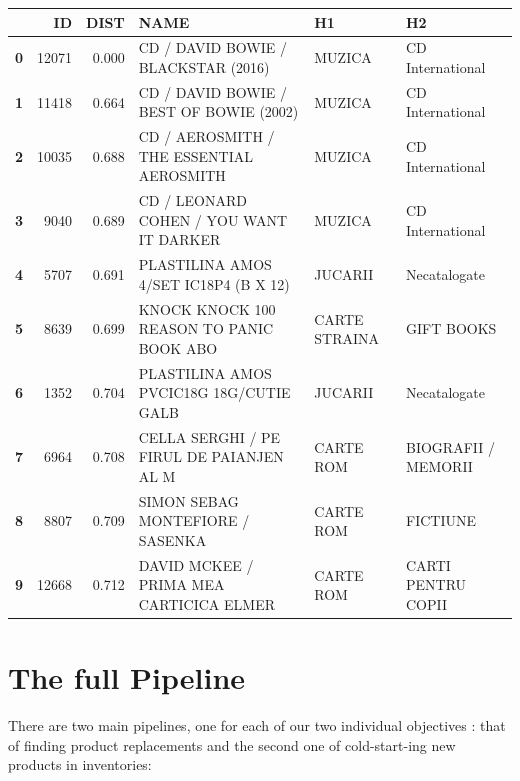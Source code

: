 \documentclass[11pt]{article}
\begin{document}
    \begin{center}
\scriptsize
\begin{tabular}{lrrlll}
\toprule
{} &     ID &  DIST &                                      NAME &             H1 &                   H2 \\
\midrule
\textbf{0} &  12071 & 0.000 &       CD / DAVID BOWIE / BLACKSTAR (2016) &         MUZICA &     CD International \\
\textbf{1} &  11418 & 0.664 &  CD / DAVID BOWIE / BEST OF BOWIE (2002)  &         MUZICA &     CD International \\
\textbf{2} &  10035 & 0.688 &  CD / AEROSMITH / THE ESSENTIAL AEROSMITH &         MUZICA &     CD International \\
\textbf{3} &   9040 & 0.689 &  CD / LEONARD COHEN / YOU WANT IT DARKER  &         MUZICA &     CD International \\
\textbf{4} &   5707 & 0.691 &    PLASTILINA  AMOS 4/SET IC18P4 (B X 12) &        JUCARII &         Necatalogate \\
\textbf{5} &   8639 & 0.699 &  KNOCK KNOCK 100 REASON TO PANIC BOOK ABO &  CARTE STRAINA &           GIFT BOOKS \\
\textbf{6} &   1352 & 0.704 &  PLASTILINA  AMOS PVCIC18G 18G/CUTIE GALB &        JUCARII &         Necatalogate \\
\textbf{7} &   6964 & 0.708 &  CELLA SERGHI / PE FIRUL DE PAIANJEN AL M &      CARTE ROM &  BIOGRAFII / MEMORII \\
\textbf{8} &   8807 & 0.709 &          SIMON SEBAG MONTEFIORE / SASENKA &      CARTE ROM &             FICTIUNE \\
\textbf{9} &  12668 & 0.712 &   DAVID MCKEE / PRIMA MEA CARTICICA ELMER &      CARTE ROM &   CARTI PENTRU COPII \\
\bottomrule
\end{tabular}
\end{center}


    


    \hypertarget{the-full-pipeline}{%
\section{The full Pipeline}\label{the-full-pipeline}}

There are two main pipelines, one for each of our two individual
objectives : that of finding product replacements and the second one of
cold-start-ing new products in inventories:
\end{document}
